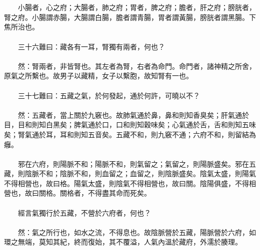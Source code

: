 \\\\
　　小腸者，心之府；大腸者，肺之府；胃者，脾之府；膽者，肝之府；膀胱者，腎之府。小腸謂赤腸，大腸謂白腸，膽者謂青腸，胃者謂黃腸，膀胱者謂黑腸。下焦所治也。
\\\\
　　三十六難曰：藏各有一耳，腎獨有兩者，何也？
\\\\
　　然：腎兩者，非皆腎也。其左者為腎，右者為命門。命門者，諸神精之所舍，原氣之所繫也。故男子以藏精，女子以繫胞，故知腎有一也。
\\\\
　　三十七難曰：五藏之氣，於何發起，通於何許，可曉以不？
\\\\
　　然：五藏者，當上關於九竅也。故肺氣通於鼻，鼻和則知香臭矣；肝氣通於目，目和則知白黑矣；脾氣通於口，口和則知穀味矣；心氣通於舌，舌和則知五味矣；腎氣通於耳，耳和則知五音矣。五藏不和，則九竅不通；六府不和，則留結為癰。
\\\\
　　邪在六府，則陽脈不和；陽脈不和，則氣留之；氣留之，則陽脈盛矣。邪在五藏，則陰脈不和；陰脈不和，則血留之；血留之，則陰脈盛矣。陰氣太盛，則陽氣不得相營也，故曰格。陽氣太盛，則陰氣不得相營也，故曰關。陰陽俱盛，不得相營也，故曰關格。關格者，不得盡其命而死矣。
\\\\
　　經言氣獨行於五藏，不營於六府者，何也？
\\\\
　　然：氣之所行也，如水之流，不得息也。故陰脈營於五藏，陽脈營於六府，如環之無端，莫知其紀，終而復始，其不覆溢，人氣內溫於藏府，外濡於腠理。